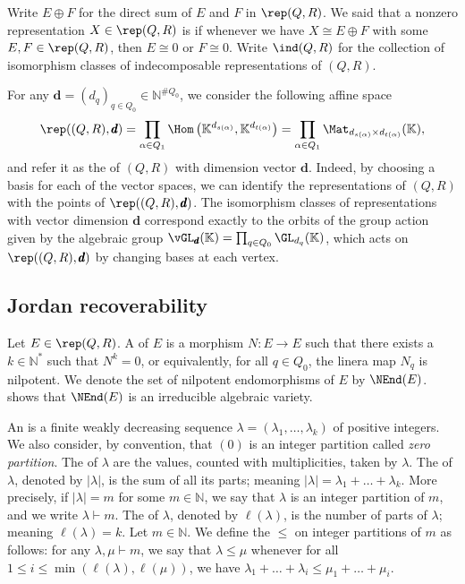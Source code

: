  Write $E \oplus F$ for the direct sum of $E$ and $F$ in $\rep(Q,R)$. We said that a nonzero representation $X \in \rep(Q,R)$ is  if whenever we have $X \cong E \oplus F$ with some $E,F \in \rep(Q,R)$, then $E \cong 0$ or $F \cong 0$. Write $\ind(Q,R)$ for the collection of isomorphism classes of indecomposable representations of $(Q,R)$.

 For any $\pmb{d} = (d_q)_{q \in Q_0} \in \mathbb{N}^{\#Q_0}$, we consider the following affine space
 \[\rep((Q,R),\pmb{d}) = \prod_{\alpha \in Q_1} \Hom \left(\mathbb{K}^{d_{s(\alpha)}}, \mathbb{K}^{d_{t(\alpha)}} \right) = \prod_{\alpha \in Q_1}  \Mat_{d_{s(\alpha)} \times d_{t(\alpha)}} (\mathbb{K}),\] and refer it as the  of $(Q,R)$ with dimension vector $\pmb{d}$. Indeed, by choosing a basis for each of the vector spaces, we can identify the representations of $(Q,R)$ with the points of $\rep((Q,R), \pmb{d})$. The isomorphism classes of representations with vector dimension $\pmb{d}$ correspond exactly to the orbits of the group action given by the algebraic group $\vGL_{\pmb{d}}(\mathbb{K}) = \prod_{q \in Q_0} \GL_{d_q}(\mathbb{K})$, which acts on $\rep((Q,R), \pmb{d})$ by changing bases at each vertex.

\subsection{Jordan recoverability}
\label{ss:JR}

Let $E \in \rep(Q,R)$. A  of $E$ is a morphism $N : E \longrightarrow E$  such that there exists a $k \in \mathbb{N}^*$ such that $N^k = 0$, or equivalently, for all $q \in Q_0$, the linera map $N_q$ is nilpotent. We denote the set of nilpotent endomorphisms of $E$ by $\NEnd(E)$. \cite{GPT19} shows that $\NEnd(E)$ is an irreducible algebraic variety.

An  is a finite weakly decreasing sequence $\lambda = (\lambda_1,\ldots,\lambda_k)$ of positive integers. We also consider, by convention, that $(0)$ is an integer partition called \emph{zero partition}. The  of $\lambda$ are the values, counted with multiplicities, taken by $\lambda$. The  of $\lambda$, denoted by $|\lambda|$, is the sum of all its parts; meaning $|\lambda| = \lambda_1 + \ldots + \lambda_k$. More precisely, if $|\lambda| = m$ for some $m \in \mathbb{N}$, we say that $\lambda$ is an integer partition of $m$, and we write $\lambda \vdash m$. The  of $\lambda$, denoted by $\ell(\lambda)$, is the number of parts of $\lambda$; meaning $\ell(\lambda) = k$. Let $m \in \mathbb{N}$. We define the  $\leqslant$ on integer partitions of $m$ as follows: for any $\lambda, \mu \vdash m$, we say that $\lambda \leqslant \mu$ whenever for all $1 \leqslant i \leqslant \min(\ell(\lambda), \ell(\mu))$, we have $\lambda_1 + \ldots + \lambda_i \leqslant \mu_1 + \ldots + \mu_i$. 

